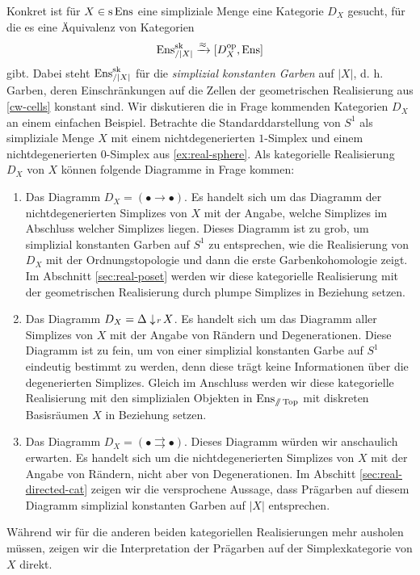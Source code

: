 Konkret ist für $X \in \operatorname{s}\operatorname{Ens}$ eine simpliziale Menge eine Kategorie
$D_X$ gesucht, für die es eine Äquivalenz von Kategorien
\[ \operatorname{Ens}_{/|X|}^{\operatorname{sk}} \xrightarrow{\approx} {[D_X^\mathrm{op}, \operatorname{Ens}]} \]
gibt. Dabei steht $\operatorname{Ens}_{/|X|}^{\operatorname{sk}}$ für die \emph{simplizial
  konstanten Garben} auf $|X|$, d. h. Garben, deren Einschränkungen
auf die Zellen der geometrischen Realisierung aus \ref{cw-cells}
konstant sind. Wir diskutieren die in Frage kommenden Kategorien $D_X$
an einem einfachen Beispiel. Betrachte die Standarddarstellung von
$S^1$ als simpliziale Menge $X$ mit einem nichtdegenerierten
$1$-Simplex und einem nichtdegenerierten $0$-Simplex aus
\ref{ex:real-sphere}. Als kategorielle Realisierung $D_X$ von $X$
können folgende Diagramme in Frage kommen:
\begin{enumerate}
\item Das Diagramm $D_X = (\bullet \to \bullet)$. Es handelt sich um
  das Diagramm der nichtdegenerierten Simplizes von $X$ mit der
  Angabe, welche Simplizes im Abschluss welcher Simplizes
  liegen. Dieses Diagramm ist zu grob, um simplizial konstanten Garben
  auf $S^1$ zu entsprechen, wie die Realisierung von $D_X$ mit der
  Ordnungstopologie und dann die erste Garbenkohomologie zeigt. Im
  Abschnitt \ref{sec:real-poset} werden wir diese kategorielle
  Realisierung mit der geometrischen Realisierung durch plumpe
  Simplizes in Beziehung setzen.
\item Das Diagramm $D_X = \Delta \downarrow \! {\scriptstyle r} \, X$. Es handelt sich um
  das Diagramm aller Simplizes von $X$ mit der Angabe von Rändern und
  Degenerationen. Diese Diagramm ist zu fein, um von einer simplizial
  konstanten Garbe auf $S^1$ eindeutig bestimmt zu werden, denn diese
  trägt keine Informationen über die degenerierten Simplizes. Gleich
  im Anschluss werden wir diese kategorielle Realisierung mit den
  simplizialen Objekten in $\operatorname{Ens}_{\mathbin{/\mkern-6mu/} \operatorname{Top}}$ mit diskreten Basisräumen $X$
  in Beziehung setzen.
\item Das Diagramm $D_X = (\bullet \rightrightarrows \bullet)$. Dieses
  Diagramm würden wir anschaulich erwarten. Es handelt sich um die
  nichtdegenerierten Simplizes von $X$ mit der Angabe von Rändern,
  nicht aber von Degenerationen. Im Abschitt
  \ref{sec:real-directed-cat} zeigen wir die versprochene Aussage,
  dass Prägarben auf diesem Diagramm simplizial konstanten Garben auf
  $|X|$ entsprechen.
\end{enumerate}

Während wir für die anderen beiden kategoriellen Realisierungen mehr
ausholen müssen, zeigen wir die Interpretation der Prägarben auf der
Simplexkategorie von $X$ direkt.

